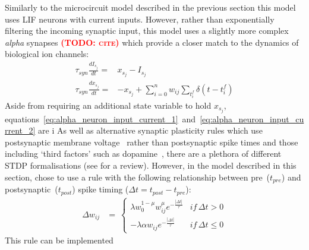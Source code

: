 \documentclass[utf8]{frontiersSCNS} %
\newcommand{\todo}[1]{\textbf{\textsc{\textcolor{red}{(TODO: #1)}}}}
\begin{document}
Similarly to the microcircuit model described in the previous section this model uses LIF neurons with current inputs.
However, rather than exponentially filtering the incoming synaptic input, this model uses a slightly more complex \textit{alpha} synapses \todo{cite} which provide a closer match to the dynamics of biological ion channels:
%
\begin{align}
    \tau_{syn} \frac{dI_{s_{j}}}{dt} = & x_{s_{j}} - I_{s_{j}} \label{eq:alpha_neuron_input_current_1}\\ 
    \tau_{syn} \frac{dx_{s_{j}}}{dt} = & -x_{s_{j}} + \sum_{i=0}^{n} w_{ij} \sum_{t_{i}^{f}}  \delta(t - t_{i}^{f}) \label{eq:alpha_neuron_input_current_2}
\end{align}
%
Aside from requiring an additional state variable to hold $x_{s_{j}}$, equations~\ref{eq:alpha_neuron_input_current_1}~and~\ref{eq:alpha_neuron_input_current_2} are i
As well as alternative synaptic plasticity rules which use postsynaptic membrane voltage~\citep{Brader2007,Clopath2010c} rather than postsynaptic spike times and those including `third factors' such as dopamine~\citep{Izhikevich2007}, there are a plethora of different STDP formalisations (see \citet{Morrison2008} for a review).
However, in the model described in this section, \citet{Morrison2007} chose to use a rule with the following relationship between pre~($t_{pre}$) and postsynaptic~($t_{post}$) spike timing ($\Delta t = t_{post} - t_{pre}$):
%
\begin{align}
    \Delta w_{ij} & = \
        \begin{cases}
            \lambda w_{0}^{1-\mu} w_{ij}^{\mu} e^{-\frac{|\Delta t|}{\tau}} & if\, \Delta t>0\\
            -\lambda \alpha w_{ij} e^{-\frac{|\Delta t|}{\tau}}             & if\, \Delta t\leq0
        \end{cases}
\end{align}
%
This rule can be implemented 
\end{document}
